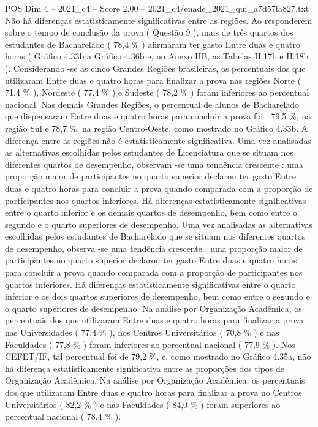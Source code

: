 \begin{textsample}{POS Dim 4 – 2021\_c4 – Score 2.00 – 2021\_c4/enade\_2021\_qui\_a7d57fa827.txt}
Não há diferenças estatisticamente significativas entre as regiões.
Ao responderem sobre o tempo de conclusão da prova ( Questão 9 ), mais de três quartos dos estudantes de Bacharelado ( 78,4 \% ) afirmaram ter gasto Entre duas e quatro horas ( Gráfico 4.33b a Gráfico 4.36b e, no Anexo IIB, as Tabelas II.17b e II.18b ).
Considerando -se as cinco Grandes Regiões brasileiras, os percentuais dos que utilizaram Entre duas e quatro horas para finalizar a prova nas regiões Norte ( 71,4 \% ), Nordeste ( 77,4 \% ) e Sudeste ( 78,2 \% ) foram inferiores ao percentual nacional.
Nas demais Grandes Regiões, o percentual de alunos de Bacharelado que dispensaram Entre duas e quatro horas para concluir a prova foi : 79,5 \%, na região Sul e 78,7 \%, na região Centro-Oeste, como mostrado no Gráfico 4.33b.
A diferença entre as regiões não é estatisticamente significativa.
Uma vez analisadas as alternativas escolhidas pelos estudantes de Licenciatura que se situam nos diferentes quartos de desempenho, observam -se uma tendência crescente : uma proporção maior de participantes no quarto superior declarou ter gasto Entre duas e quatro horas para concluir a prova quando comparada com a proporção de participantes nos quartos inferiores.
Há diferenças estatisticamente significativas entre o quarto inferior e os demais quartos de desempenho, bem como entre o segundo e o quarto superiores de desempenho.
Uma vez analisadas as alternativas escolhidas pelos estudantes de Bacharelado que se situam nos diferentes quartos de desempenho, observa -se uma tendência crescente : uma proporção maior de participantes no quarto superior declarou ter gasto Entre duas e quatro horas para concluir a prova quando comparada com a proporção de participantes nos quartos inferiores.
Há diferenças estatisticamente significativas entre o quarto inferior e os dois quartos superiores de desempenho, bem como entre o segundo e o quarto superiores de desempenho.
Na análise por Organização Acadêmica, os percentuais dos que utilizaram Entre duas e quatro horas para finalizar a prova nas Universidades ( 77,4 \% ), nos Centros Universitários ( 70,8 \% ) e nas Faculdades ( 77,8 \% ) foram inferiores ao percentual nacional ( 77,9 \% ).
Nos CEFET/IF, tal percentual foi de 79,2 \%, e, como mostrado no Gráfico 4.35a, não há diferença estatisticamente significativa entre as proporções dos tipos de Organização Acadêmica.
Na análise por Organização Acadêmica, os percentuais dos que utilizaram Entre duas e quatro horas para finalizar a prova no Centros Universitários ( 82,2 \% ) e nas Faculdades ( 84,0 \% ) foram superiores ao percentual nacional ( 78,4 \% ).

\end{textsample}
